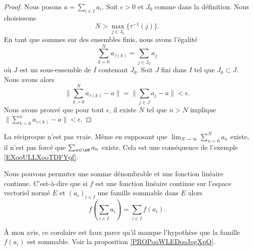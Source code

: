 \begin{proof}
    Nous posons \( a=\sum_{i\in I}a_i\). Soit \( \epsilon>0\) et \( J_0\) comme dans la définition. Nous choisissons
    \begin{equation}
        N>\max_{j\in J_0}\{ \tau^{-1}(j) \}.
    \end{equation}
    En tant que sommes sur des ensembles finis, nous avons l'égalité
    \begin{equation}
        \sum_{k=0}^Na_{\tau(k)}=\sum_{j\in J_0}a_j
    \end{equation}
    où \( J\) est un sous-ensemble de \( I\) contenant \( J_0\). Soit \( J\) fini dans \( I\) tel que \( J_0\subset J\). Nous avons alors
    \begin{equation}
        \| \sum_{k=0}^Na_{\tau(k)}-a \|=\| \sum_{j\in J}a_j-a \|<\epsilon.
    \end{equation}
    Nous avons prouvé que pour tout \( \epsilon\), il existe \( N\) tel que \( n>N\) implique \( \| \sum_{k=0}^na_{\tau(k)}-a\| <\epsilon\).
\end{proof}

La réciproque n'est pas vraie. Même en supposant que \( \lim_{N\to \infty} \sum_{n=0}^Na_n\) existe, il n'est pas forcé que \( \sum_{n\in\eN}a_n\) existe. Cela est une conséquence de l'exemple \ref{EXooULLXooTDFYqf}.

\begin{corollary}       \label{CORooBPILooWDXpUM}       %
    Nous pouvons permuter une somme dénombrable et une fonction linéaire continue. C'est-à-dire que si \( f\) est une fonction linéaire continue sur l'espace vectoriel normé \( E\) et \( (a_i)_{i\in I}\) une famille sommable dans \( E\) alors
    \begin{equation}
        f\left( \sum_{i\in I}a_i \right)=\sum_{i\in I}f(a_i).
    \end{equation}
\end{corollary}

\begin{probleme}
    À mon avis, ce corolaire est faux parce qu'il manque l'hypothèse que la famille \( f(a_i)\) est sommable. Voir la proposition \ref{PROPooWLEDooJogXpQ}.
\end{probleme}


